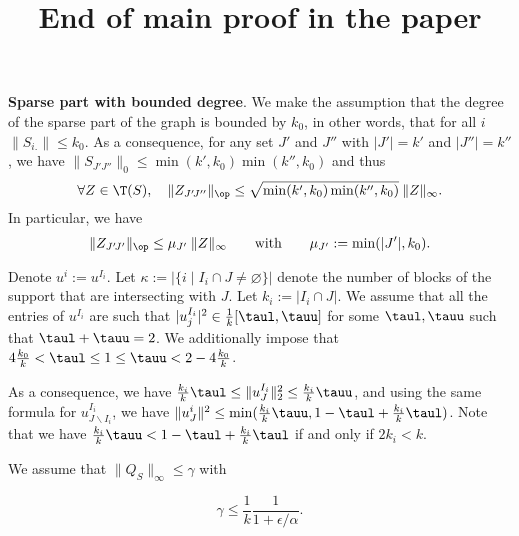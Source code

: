 \documentclass{article}
\title{End of main proof in the paper}
\date
\begin{document}
\maketitle
\appendix

\textbf{Sparse part with bounded degree}. We make the assumption that the degree of the sparse part of the graph is bounded by $k_0$, in other words, that for all $i$ $\|S_{i.}\| \leq k_0$. As a consequence, for any set $J'$ and $J''$ with $|J'|=k'$ and $|J''|=k''$, we have $\|S_{J'\! J''}\|_0 \leq \min(k',k_0) \min(k'',k_0)$ and thus $$\forall Z \in \T(S), \quad  \|Z_{J'\! J''}\|_{\op} \leq \sqrt{\min(k',k_0) \min(k'',k_0)}  \: \|Z\|_{\infty}.$$
In particular, we have 
$$\|Z_{J'\! J'}\|_{\op} \leq \mu_{J'}  \: \|Z\|_{\infty} \qquad \text{with} \qquad \mu_{J'}:=\min(|J'|,k_0).$$


Denote $u^i:=u^{I_i}$. %
Let $\kappa:=|\{i \mid I_i \cap J \neq \varnothing\}|$ denote the number of blocks of the support that are intersecting with $J$. Let $k_i:=|I_i \cap J|$. We assume that all the entries of $u^{I_i}$ are such that $|u^{I_i}_j|^2 \in \frac{1}{k}[\taul, \tauu]$ for some  $\taul, \tauu$ such that $\taul+\tauu=2$. We additionally impose that $4 \frac{k_0}{k} < \taul \leq 1 \leq \tauu < 2-4 \frac{k_0}{k}$. 

As a consequence, we have $\frac{k_i}{k} \taul \leq \|u^{I_i}_J\|_2^2 \leq \frac{k_i}{k} \tauu$,
and using the same formula for $u^{I_i}_{J \backslash I_i}$, we have
$\|u^i_J\|^2 \leq \min (\frac{k_i}{k} \tauu, 1-\taul+\frac{k_i}{k} \taul)$. Note that we have $\frac{k_i}{k} \tauu < 1-\taul+\frac{k_i}{k} \taul$ if and only if $2k_i<k$. 

We assume that $\|Q_{S}\|_{\infty} \leq \gamma$ with 

$$\gamma \leq \frac{1}{k} \frac{1}{1+\epsilon/\alpha }.$$
\end{document}
